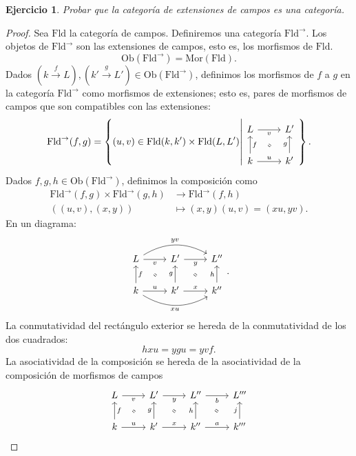 \documentclass[12pt,letterpaper,titlepage]{article}
\newtheorem{exe}{Ejercicio}
\theoremstyle{definition}
\newcommand\rar[1]{\xrightarrow{#1}}
\newcommand\<{\langle}
\renewcommand\>{\rangle}
\newcommand{\Ob}{\mathrm{Ob}}
\newcommand{\Mor}{\mathrm{Mor}}
\newcommand{\Fld}{\mathrm{Fld}}
\begin{document}
\begin{exe}%
  Probar que la categoría de extensiones de campos es una categoría.
\end{exe}
  \begin{proof}
    Sea $\Fld$ la categoría de campos. Definiremos una categoría $\Fld^\to$. Los objetos de $\Fld^\to$ son las extensiones de campos, esto es, los morfismos de $\Fld$.
  \[
    \Ob(\Fld^\to) = \Mor(\Fld)
  .\]
  Dados $(k\rar f L),(k'\rar gL')\in\Ob(\Fld^\to)$, definimos
  los morfismos de $f$ a $g$ en la categoría $\Fld^\to$
  como morfismos de extensiones; esto es,
  pares de morfismos de campos que son compatibles con
  las extensiones:
  \[
    \Fld^\to(f,g)
    = \left\{
      (u,v)\in \Fld(k,k')\times \Fld(L,L')
      \middle|
      \begin{tikzcd}
        L \ar[r,"v"'] & L' \\
        k \ar[u,"f"'] \ar[r,"u"] & k' \ar[u,"g"]
        \ar[equal,from=1-1,to=2-2,shorten=5mm]
      \end{tikzcd}
    \right\}
  .\]
  Dados $f,g,h\in\Ob(\Fld^\to)$, definimos la composición como
  \begin{align*}
    \Fld^\to(f,g)\times\Fld^\to(g,h) &\to \Fld^\to(f,h) \\
    ((u,v) , (x,y)) &\mapsto (x,y)(u,v)=(xu,yv).
  \end{align*}
  En un diagrama:
  \[
      \begin{tikzcd}
        L \ar[r,"v"'] \ar[rr,bend left,"yv"] & L' \ar[r,"y"'] & L''\\
        k \ar[u,"f"'] \ar[r,"u"] \ar[rr,bend right,"xu"']
        & k' \ar[u,"g"] \ar[r,"x"] & k''\ar[u,"h"]
        \ar[equal,from=1-1,to=2-2,shorten=5mm]
        \ar[equal,from=1-2,to=2-3,shorten=5mm]
      \end{tikzcd}
  .\]
  La conmutatividad del rectángulo exterior se hereda de la
  conmutatividad de los dos cuadrados:
    \[
        hxu = ygu = yvf
    .\]
  La asociatividad de la composición se hereda de la
  asociatividad de la composición de morfismos de campos
  \[
      \begin{tikzcd}
        L \ar[r,"v"'] & L' \ar[r,"y"'] & L'' \ar[r,"b"'] & L'''\\
        k \ar[u,"f"'] \ar[r,"u"]
        & k' \ar[u,"g"] \ar[r,"x"]
        & k''\ar[u,"h"] \ar[r,"a"]
        & k''' \ar[u,"j"]
        \ar[equal,from=1-1,to=2-2,shorten=5mm]
        \ar[equal,from=1-2,to=2-3,shorten=5mm]
        \ar[equal,from=1-3,to=2-4,shorten=5mm]
      \end{tikzcd}
\]
\end{proof}
\end{document}
